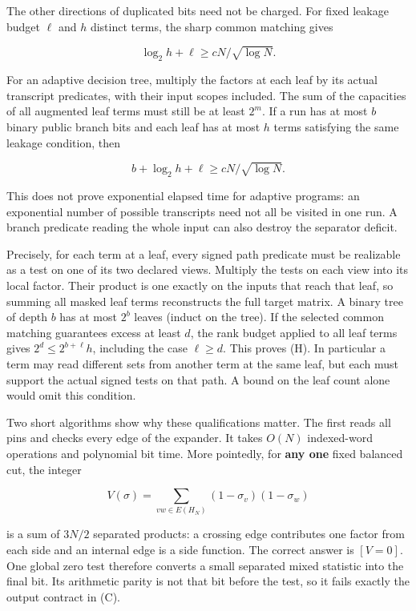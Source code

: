 \documentclass[
  11pt,
]{article}
\begin{document}
The other directions of duplicated bits need not be charged. For fixed
leakage budget \(\ell\) and \(h\) distinct terms, the sharp common
matching gives

\[
\log_2h+\ell\ge cN/\sqrt{\log N}.
\tag{G}
\]

For an adaptive decision tree, multiply the factors at each leaf by its
actual transcript predicates, with their input scopes included. The sum
of the capacities of all augmented leaf terms must still be at least
\(2^m\). If a run has at most \(b\) binary public branch bits and each
leaf has at most \(h\) terms satisfying the same leakage condition, then

\[
b+\log_2h+\ell\ge cN/\sqrt{\log N}.
\tag{H}
\]

This does not prove exponential elapsed time for adaptive programs: an
exponential number of possible transcripts need not all be visited in
one run. A branch predicate reading the whole input can also destroy the
separator deficit.

Precisely, for each term at a leaf, every signed path predicate must be
realizable as a test on one of its two declared views. Multiply the tests
on each view into its local factor. Their product is one exactly on the
inputs that reach that leaf, so summing all masked leaf terms reconstructs
the full target matrix. A binary tree of depth \(b\) has at most \(2^b\)
leaves (induct on the tree). If the selected common matching guarantees
excess at least \(d\), the rank budget applied to all leaf terms gives
\(2^d\le 2^{b+\ell}h\), including the case \(\ell\ge d\).
This proves (H). In particular a term may read different sets from
another term at the same leaf, but each must support the actual signed
tests on that path. A bound on the leaf count alone would omit this
condition.

Two short algorithms show why these qualifications matter. The first
reads all pins and checks every edge of the expander. It takes \(O(N)\)
indexed-word operations and polynomial bit time. More pointedly, for
\textbf{any one} fixed balanced cut, the integer

\[
V(\sigma)=\sum_{vw\in E(H_N)}(1-\sigma_v)(1-\sigma_w)
\]

is a sum of \(3N/2\) separated products: a crossing edge contributes one
factor from each side and an internal edge is a side function. The
correct answer is \([V=0]\). One global zero test therefore converts a
small separated mixed statistic into the final bit. Its arithmetic
parity is not that bit before the test, so it fails exactly the output
contract in (C).
\end{document}
